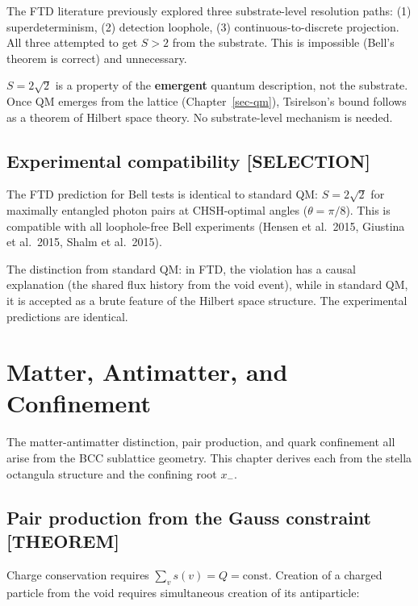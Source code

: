 \documentclass[
  11pt,
  letterpaper,
  twoside,
  openany]{book}
\makeatletter
\let\orig@section\section
\renewcommand{\section}{\needspace{8\baselineskip}\orig@section}
\makeatother
\begin{document}
The FTD literature previously explored three substrate-level resolution
paths: (1) superdeterminism, (2) detection loophole, (3)
continuous-to-discrete projection. All three attempted to get \(S > 2\)
from the substrate. This is impossible (Bell's theorem is correct) and
unnecessary.

\(S = 2\sqrt{2}\) is a property of the \textbf{emergent} quantum
description, not the substrate. Once QM emerges from the lattice
(Chapter~\ref{sec-qm}), Tsirelson's bound follows as a theorem of
Hilbert space theory. No substrate-level mechanism is needed.

\section{Experimental compatibility
{[}SELECTION{]}}\label{experimental-compatibility-selection}

The FTD prediction for Bell tests is identical to standard QM:
\(S = 2\sqrt{2}\) for maximally entangled photon pairs at CHSH-optimal
angles (\(\theta = \pi/8\)). This is compatible with all loophole-free
Bell experiments (Hensen et al.~2015, Giustina et al.~2015, Shalm et
al.~2015).

The distinction from standard QM: in FTD, the violation has a causal
explanation (the shared flux history from the void event), while in
standard QM, it is accepted as a brute feature of the Hilbert space
structure. The experimental predictions are identical.

\chapter{Matter, Antimatter, and Confinement}\label{sec-confinement}

The matter-antimatter distinction, pair production, and quark
confinement all arise from the BCC sublattice geometry. This chapter
derives each from the stella octangula structure and the confining root
\(x_-\).

\section{Pair production from the Gauss constraint
{[}THEOREM{]}}\label{pair-production-from-the-gauss-constraint-theorem}

Charge conservation requires \(\sum_v s(v) = Q = \text{const}\).
Creation of a charged particle from the void requires simultaneous
creation of its antiparticle:
\end{document}

